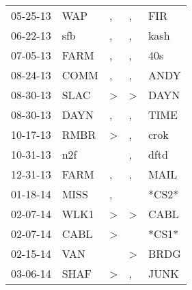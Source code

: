 \begin{supertabular}{p{0.07\textwidth}p{0.06\textwidth}p{0.02\textwidth}p{0.02\textwidth}p{0.06\textwidth}}
          05-25-13\textsuperscript{} &            WAP\textsuperscript{} &                , &                , &            FIR\textsuperscript{} \\
          06-22-13\textsuperscript{} &            sfb\textsuperscript{} &                , &                , &           kash\textsuperscript{} \\
          07-05-13\textsuperscript{} &           FARM\textsuperscript{} &                , &                , &            40s\textsuperscript{} \\
          08-24-13\textsuperscript{} &           COMM\textsuperscript{} &                , &                , &           ANDY\textsuperscript{} \\
          08-30-13\textsuperscript{} &           SLAC\textsuperscript{} &     \textgreater &     \textgreater &           DAYN\textsuperscript{} \\
          08-30-13\textsuperscript{} &           DAYN\textsuperscript{} &                , &                , &           TIME\textsuperscript{} \\
          10-17-13\textsuperscript{} &           RMBR\textsuperscript{} &     \textgreater &                , &           crok\textsuperscript{} \\
          10-31-13\textsuperscript{} &            n2f\textsuperscript{} &                  &                , &           dftd\textsuperscript{} \\
          12-31-13\textsuperscript{} &           FARM\textsuperscript{} &                , &                , &           MAIL\textsuperscript{} \\
          01-18-14\textsuperscript{} &           MISS\textsuperscript{} &                , &                  &                            *CS2* \\
          02-07-14\textsuperscript{} &           WLK1\textsuperscript{} &     \textgreater &     \textgreater &           CABL\textsuperscript{} \\
          02-07-14\textsuperscript{} &           CABL\textsuperscript{} &     \textgreater &                  &                            *CS1* \\
          02-15-14\textsuperscript{} &            VAN\textsuperscript{} &                  &     \textgreater &           BRDG\textsuperscript{} \\
          03-06-14\textsuperscript{} &           SHAF\textsuperscript{} &     \textgreater &                , &           JUNK\textsuperscript{} \\

\end{supertabular}
